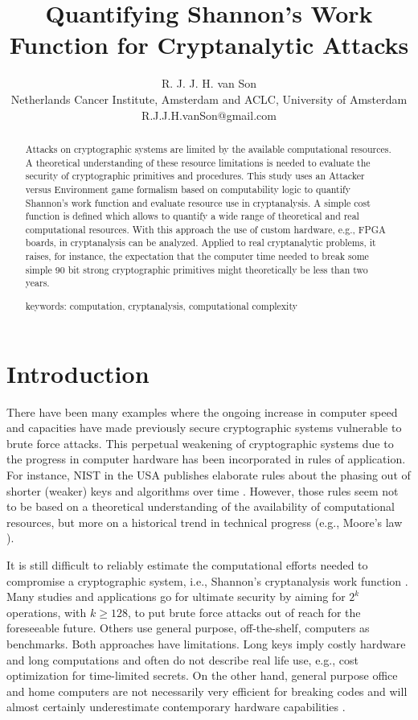\documentclass{article}
\title{Quantifying Shannon's Work Function for Cryptanalytic Attacks}
\author{R. J. J. H. van Son\\
Netherlands Cancer Institute, Amsterdam and ACLC, University of Amsterdam\\
R.J.J.H.vanSon@gmail.com}
\begin{document}
\maketitle
\newpage

\begin{abstract}
\noindent
Attacks on cryptographic systems are limited by the available computational resources.
A  theoretical understanding of these resource limitations 
is needed to evaluate the security of cryptographic primitives and procedures. 
This study uses an Attacker versus Environment game formalism based on 
computability logic to quantify Shannon's work function and evaluate resource use in cryptanalysis. 
A simple cost function is defined which allows to quantify a wide range
of theoretical and real computational resources. With this approach the use of 
custom hardware, e.g., FPGA boards, in cryptanalysis can be analyzed. 
Applied to real cryptanalytic problems, it raises, for instance, the expectation
that the computer time needed to break some simple 90 bit strong cryptographic 
primitives might theoretically be less than two years.

\noindent
keywords: computation, cryptanalysis, computational complexity
\end{abstract}

\newpage
\section{Introduction}

There have been many examples where the ongoing increase in computer speed and 
capacities have made previously secure cryptographic systems vulnerable to brute 
force attacks. This perpetual weakening of cryptographic systems due to the 
progress in computer hardware has been incorporated in rules of application. 
For instance, NIST in the USA publishes elaborate rules about the phasing out 
of shorter (weaker) keys and algorithms over time \cite{Polketal2006,BarkerNIST2004}. 
However, those rules seem not to be based on a theoretical
understanding of the availability of computational resources, but more on a 
historical trend in technical progress (e.g., Moore's law \cite{tuomi2002lives}).

It is still difficult to reliably estimate the computational efforts needed to compromise a 
cryptographic system, i.e., Shannon's cryptanalysis work function
\cite{Shannon1949}. 
Many studies and applications go for ultimate security by aiming for $2^k$ operations, with 
$k\ge 128$, to put brute force attacks out of reach for the foreseeable future. Others use 
general purpose, off-the-shelf, computers as benchmarks. Both approaches 
have limitations. Long keys imply costly hardware and long computations and often do not describe
real life use, e.g., cost optimization for time-limited secrets. On the other hand, general 
purpose office and home computers are not necessarily 
very efficient for breaking codes and will almost certainly underestimate contemporary 
hardware capabilities \cite{Son0911-5262}.
\end{document}
